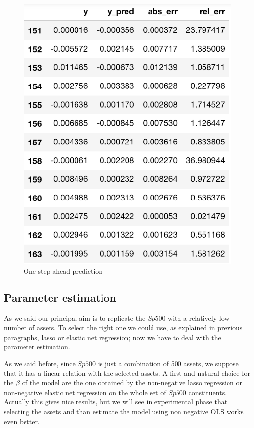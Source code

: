 \documentclass{article}%
\begin{document}
\begin{figure}[h!!!]
  \centering
  \includegraphics[scale=0.55]{pred_step1.png}
  \caption{One-step ahead prediction}
  \label{err_step}
\end{figure}




\subsection{Parameter estimation}
As we said our principal aim is to replicate the $Sp500$ with a relatively low number of assets. To select the right one we could use, as explained in previous paragraphs, lasso or elastic net regression; now we have to deal with the parameter estimation.

As we said before, since  $Sp500$ is just a combination of 500 assets, we suppose that it has a linear relation with the selected assets. A first and natural choice for the $\beta$ of the model are the one obtained by the non-negative lasso regression or non-negative elastic net regression on the whole set of $Sp500$ constituents. Actually this gives nice results, but we will see in experimental phase that selecting the assets and than estimate the model using non negative OLS works even better. 
\\
\end{document}
